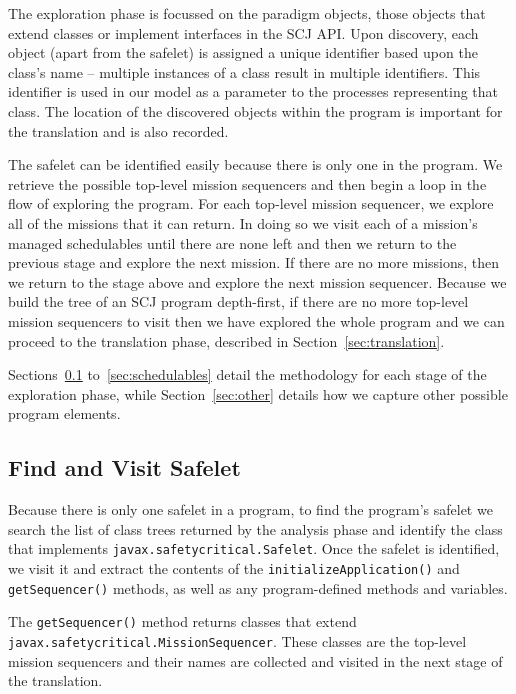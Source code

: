 \documentclass[10pt,a4paper]{article}
\begin{document}
The exploration phase is focussed on the paradigm objects, those objects that extend classes or implement interfaces in the SCJ API. Upon discovery, each object (apart from the safelet) is assigned a unique identifier based upon the class's name -- multiple instances of a class result in multiple identifiers. This identifier is used in our model as a parameter to the processes representing that class. The location of the discovered objects within the program is important for the translation and is also recorded.

The safelet can be identified easily because there is only one in the program. We retrieve the possible top-level mission sequencers and then begin a loop in the flow of exploring the program. For each top-level mission sequencer, we explore all of the missions that it can return. In doing so we visit each of a mission's managed schedulables until there are none left and then we return to the previous stage and explore the next mission. If there are no more missions, then we return to the stage above and explore the next mission sequencer. Because we build the tree of an SCJ program depth-first, if there are no more top-level mission sequencers to visit then we have explored the whole program and we can proceed to the translation phase, described in Section~\ref{sec:translation}.

Sections~\ref{sec:safelet} to~\ref{sec:schedulables} detail the methodology for each stage of the exploration phase, while Section~\ref{sec:other} details how we capture other possible program elements. 

\subsection{Find and Visit Safelet}
\label{sec:safelet}

Because there is only one safelet in a program, to find the program's safelet we search the list of class trees returned by the analysis phase and identify the class that implements \texttt{javax.safetycritical.Safelet}. Once the safelet is identified, we visit it and extract the contents of the \texttt{initializeApplication()} and \texttt{getSequencer()} methods, as well as any program-defined methods and variables. 

The \texttt{getSequencer()} method returns classes that extend \texttt{javax.safetycritical.MissionSequencer}. These classes are the top-level mission sequencers and their names are collected and visited in the next stage of the translation. 
\end{document}
